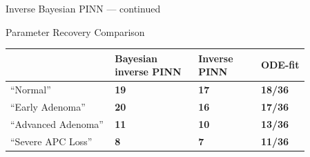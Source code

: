 \documentclass[aspectratio=169,11pt]{beamer}
\begin{document}
\begin{frame}{Inverse Bayesian PINN --- continued}
  \vspace{0.12cm}
  \centering
\end{frame}

\begin{frame}{Parameter Recovery Comparison}
  \cornermarkbr
  \vspace{0.50cm}
  \centering
  \begin{minipage}{0.90\textwidth}
    \fontsize{12.5}{16}\selectfont
    \renewcommand{\arraystretch}{1.62}
    \begin{tabular}{@{}p{0.30\linewidth}
                      >{\raggedleft\arraybackslash}p{0.24\linewidth}
                      >{\raggedleft\arraybackslash}p{0.18\linewidth}
                      >{\raggedleft\arraybackslash}p{0.14\linewidth}@{}}
      \toprule
      \color{Snow}
        & \bfseries\color{Snow}Bayesian inverse PINN
        & \bfseries\color{Snow}Inverse PINN
        & \bfseries\color{Snow}ODE-fit \\
      \midrule
      \color{Snow}``Normal''            & \color{Snow}\bfseries 19 & \color{Snow}\bfseries 17 & \color{Snow}\bfseries 18/36 \\
      \color{Snow}``Early Adenoma''     & \color{Snow}\bfseries 20 & \color{Snow}\bfseries 16 & \color{Snow}\bfseries 17/36 \\
      \color{Snow}``Advanced Adenoma''  & \color{Snow}\bfseries 11 & \color{Snow}\bfseries 10 & \color{Snow}\bfseries 13/36 \\
      \color{Snow}``Severe APC Loss''   & \color{Snow}\bfseries  8 & \color{Snow}\bfseries  7 & \color{Snow}\bfseries 11/36 \\
      \bottomrule
    \end{tabular}
  \end{minipage}
\end{frame}
\end{document}
